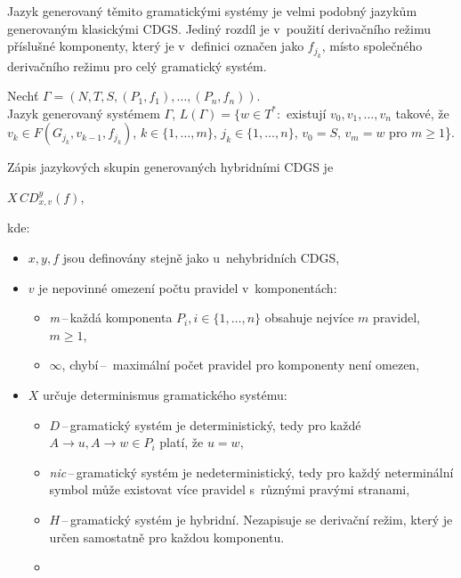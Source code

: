 Jazyk generovaný těmito gramatickými systémy je velmi podobný jazykům generovaným klasickými CDGS.
Jediný rozdíl je v~použití derivačního režimu příslušné komponenty, který je v~definici označen jako $f_{j_k}$, místo společného derivačního režimu pro celý gramatický systém.
\begin{definition}
    Nechť $\Gamma = (N, T, S, (P_1, f_1), \ldots, (P_n, f_n))$.\\
    Jazyk generovaný systémem $\Gamma$, $L(\Gamma) = \{w \in T^*:$ existují $v_0, v_1,\ldots, v_n$ takové, že \\ $v_k \in F(G_{j_k}, v_{k-1}, f_{j_k})$, $k \in \{1, \ldots, m\}$, $j_k \in \{1, \ldots, n\}$, $v_0 = S$, $v_m = w$ pro $m \geq 1$\}.
\end{definition}

Zápis jazykových skupin generovaných hybridními CDGS je
\begin{center}
    $X\,CD^y_{x, v}(f) $, 
\end{center}
kde:
\begin{itemize}
    \item $x, y, f$ jsou definovány stejně jako u~nehybridních CDGS,
    \item $v$ je nepovinné omezení počtu pravidel v~komponentách:
    \begin{itemize}[label=$\circ$]
        \item \emph{m}\,--\,každá komponenta $P_i, i \in \{1, \ldots, n\}$ obsahuje nejvíce $m$ pravidel, $m \geq 1$,
        \item $\infty$, chybí\,--\, maximální počet pravidel pro komponenty není omezen,
    \end{itemize}
    \item $X$ určuje determinismus gramatického systému:
    \begin{itemize}[label=$\circ$]
        \item $D$\,--\,gramatický systém je deterministický, tedy pro každé $A \rightarrow u, A \rightarrow w \in P_i$ platí, že $u = w$,
        \item \emph{nic}\,--\,gramatický systém je nedeterministický, tedy pro každý neterminální symbol může existovat více pravidel s~různými pravými stranami,
        \item $H$\,--\,gramatický systém je hybridní. 
        Nezapisuje se derivační režim, který je určen samostatně pro každou komponentu. 
        \item {}
    \end{itemize}
\end{itemize}

